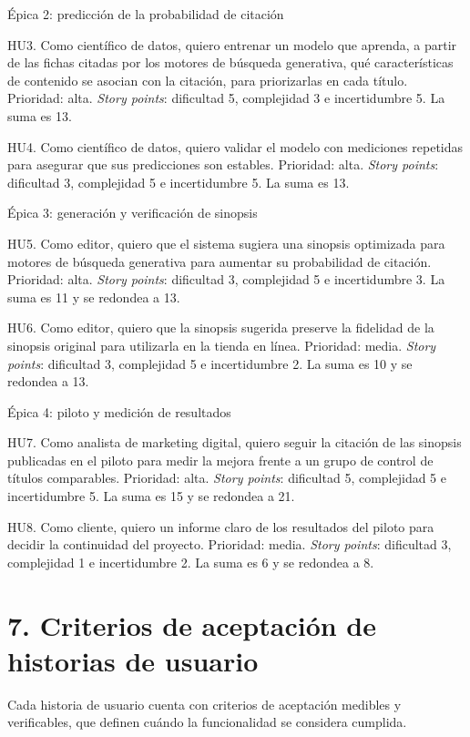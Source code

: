 \documentclass[
11pt, %
codirector, %
]{charter}
\begin{document}
Épica 2: predicción de la probabilidad de citación

HU3. Como científico de datos, quiero entrenar un modelo que aprenda, a partir de las fichas citadas por los motores de búsqueda generativa, qué características de contenido se asocian con la citación, para priorizarlas en cada título. Prioridad: alta. \textit{Story points}: dificultad 5, complejidad 3 e incertidumbre 5. La suma es 13.

HU4. Como científico de datos, quiero validar el modelo con mediciones repetidas para asegurar que sus predicciones son estables. Prioridad: alta. \textit{Story points}: dificultad 3, complejidad 5 e incertidumbre 5. La suma es 13.

Épica 3: generación y verificación de sinopsis

HU5. Como editor, quiero que el sistema sugiera una sinopsis optimizada para motores de búsqueda generativa para aumentar su probabilidad de citación. Prioridad: alta. \textit{Story points}: dificultad 3, complejidad 5 e incertidumbre 3. La suma es 11 y se redondea a 13.

HU6. Como editor, quiero que la sinopsis sugerida preserve la fidelidad de la sinopsis original para utilizarla en la tienda en línea. Prioridad: media. \textit{Story points}: dificultad 3, complejidad 5 e incertidumbre 2. La suma es 10 y se redondea a 13.

Épica 4: piloto y medición de resultados

HU7. Como analista de marketing digital, quiero seguir la citación de las sinopsis publicadas en el piloto para medir la mejora frente a un grupo de control de títulos comparables. Prioridad: alta. \textit{Story points}: dificultad 5, complejidad 5 e incertidumbre 5. La suma es 15 y se redondea a 21.

HU8. Como cliente, quiero un informe claro de los resultados del piloto para decidir la continuidad del proyecto. Prioridad: media. \textit{Story points}: dificultad 3, complejidad 1 e incertidumbre 2. La suma es 6 y se redondea a 8.

\section{7. Criterios de aceptación de historias de usuario}
\label{sec:criteriosAceptacion}

Cada historia de usuario cuenta con criterios de aceptación medibles y verificables, que definen cuándo la funcionalidad se considera cumplida.
\end{document}
